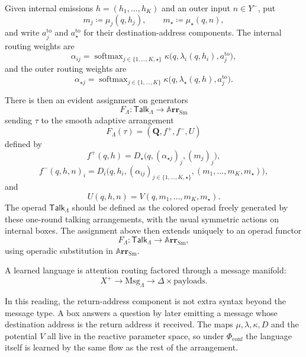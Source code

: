 \documentclass[11pt]{article}
\theoremstyle{plain}
\theoremstyle{definition}
\theoremstyle{remark}
\newcommand{\Cat}[1]{\mathbf{#1}}
\newcommand{\Sm}{\mathrm{Sm}}
\newcommand{\arr}{\mathbb{A}\Cat{rr}}    %
\newcommand{\sarr}{\arr_{\Sm}}           %
\newcommand{\rv}[1]{\mathbf{#1}}         %
\newcommand{\sharpR}{\sharp}
\newcommand{\inpt}[1]{#1^{-}}
\newcommand{\outp}[1]{#1^{+}}
\newcommand{\conf}{\mathrm{conf}}
\newcommand{\Phiconf}{\Phi_{\conf}}
\DeclareMathOperator{\softmax}{softmax}
\begin{document}
Given internal emissions $h=(h_1,\ldots,h_K)$ and an outer input
$n\in\inpt Y$, put
\[
  m_j\coloneqq\mu_j(q,h_j),
  \qquad
  m_\star\coloneqq\mu_\star(q,n),
\]
and write $a_j^{\mathrm{to}}$ and $a_\star^{\mathrm{to}}$ for their
destination-address components. The internal routing weights are
\[
  \alpha_{ij}
  =
  \softmax_{j\in\{1,\ldots,K,\star\}}
  \kappa\bigl(q,\lambda_i(q,h_i),a_j^{\mathrm{to}}\bigr),
\]
and the outer routing weights are
\[
  \alpha_{\star j}
  =
  \softmax_{j\in\{1,\ldots,K\}}
  \kappa\bigl(q,\lambda_\star(q,h),a_j^{\mathrm{to}}\bigr).
\]

There is then an evident assignment on generators
\[
  F_\Lambda\colon\mathsf{Talk}_{\Lambda}\longrightarrow\sarr
\]
sending $\tau$ to the smooth adaptive arrangement
\[
  F_\Lambda(\tau)=(\rv Q,\outp f,\inpt f,U)
\]
defined by
\[
  \outp f(q,h)
  =
  D_\star\bigl(q,(\alpha_{\star j})_j,(m_j)_j\bigr),
\]
\[
  \inpt f(q,h,n)_i
  =
  D_i\bigl(q,h_i,(\alpha_{ij})_{j\in\{1,\ldots,K,\star\}},
    (m_1,\ldots,m_K,m_\star)\bigr),
\]
and
\[
  U(q,h,n)=V(q,m_1,\ldots,m_K,m_\star).
\]
The operad $\mathsf{Talk}_{\Lambda}$ should be defined as the colored
operad freely generated by these one-round talking arrangements, with the
usual symmetric actions on internal boxes. The assignment above then
extends uniquely to an operad functor
\[
  F_\Lambda\colon\mathsf{Talk}_{\Lambda}\to\sarr,
\]
using operadic substitution in $\sarr$.

\begin{slogan}
A learned language is attention routing factored through a message
manifold:
\[
  \outp X
  \longrightarrow
  \mathrm{Msg}_{\Lambda}
  \longrightarrow
  \Delta\times\text{payloads}.
\]
\end{slogan}

In this reading, the return-address component is not extra syntax beyond
the message type. A box answers a question by later emitting a message
whose destination address is the return address it received. The maps
$\mu,\lambda,\kappa,D$ and the potential $V$ all live in the reactive
parameter space, so under $\Phiconf$ the language itself is learned by the
same flow as the rest of the arrangement.
\end{document}

